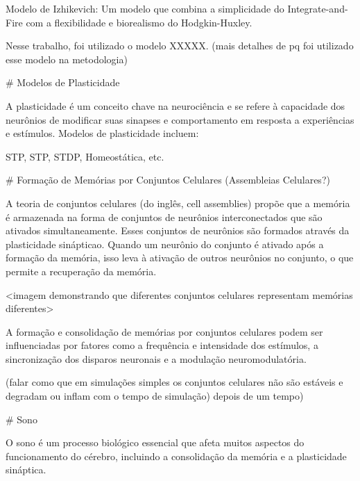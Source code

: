Modelo de Izhikevich: Um modelo que combina a simplicidade
do Integrate-and-Fire com a flexibilidade e biorealismo do Hodgkin-Huxley.

Nesse trabalho, foi utilizado o modelo XXXXX. (mais detalhes de pq foi utilizado esse modelo na metodologia)

# Modelos de Plasticidade

A plasticidade é um conceito chave na neurociência e se refere à capacidade dos neurônios de modificar suas sinapses e
comportamento em resposta a experiências e estímulos. Modelos de plasticidade incluem:

STP, STP, STDP, Homeostática, etc.

# Formação de Memórias por Conjuntos Celulares (Assembleias Celulares?)
 
A teoria de conjuntos celulares (do inglês, cell assemblies) propõe que a memória é armazenada na forma de conjuntos de neurônios
interconectados que são ativados simultaneamente. Esses conjuntos de neurônios são formados através da plasticidade sinápticao.
Quando um neurônio do conjunto é ativado após a formação da memória, isso leva à ativação de outros neurônios no conjunto, o que
permite a recuperação da memória.

<imagem demonstrando que diferentes conjuntos celulares representam memórias diferentes>

A formação e consolidação de memórias por conjuntos celulares podem ser influenciadas por fatores como a frequência e intensidade
dos estímulos, a sincronização dos disparos neuronais e a modulação neuromodulatória.

(falar como que em simulações simples os conjuntos celulares não são estáveis e degradam ou inflam com o tempo de simulação)
depois de um tempo)

# Sono

O sono é um processo biológico essencial que afeta muitos aspectos do funcionamento do cérebro, incluindo a consolidação da
memória e a plasticidade sináptica.